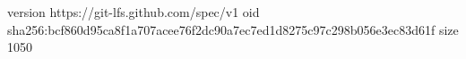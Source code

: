 version https://git-lfs.github.com/spec/v1
oid sha256:bcf860d95ca8f1a707acee76f2dc90a7ec7ed1d8275c97c298b056e3ec83d61f
size 1050
